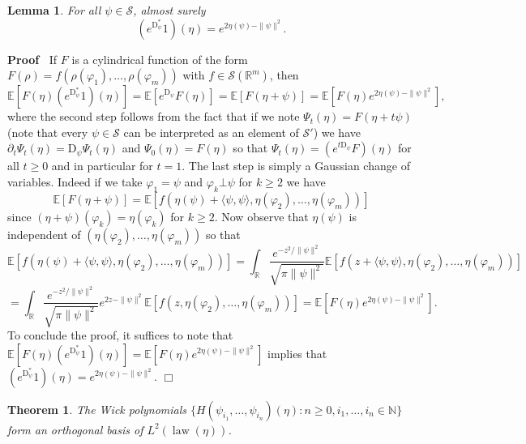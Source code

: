 \documentclass[a4paper,11pt]{article}
\newcommand{\mathD}{\mathrm{D}}
\newcommand{\tmop}[1]{\ensuremath{\operatorname{#1}}}
\newenvironment{proof}{\noindent\textbf{Proof\ }}{\hspace*{\fill}$\Box$\medskip}
\newtheorem{lemma}{Lemma}
{\theorembodyfont{\rmfamily}\newtheorem{remark}{Remark}}
\newtheorem{theorem}{Theorem}
\newcommand{\CS}{\mathscr{S}}
\begin{document}
\begin{lemma}
  \label{lem:exp-D-star}For all $\psi \in \CS$, almost surely
  \[ (e^{\mathD^{\ast}_{\psi}} 1) (\eta) = e^{2 \eta (\psi) - \| \psi \|^2} .
  \]
\end{lemma}

\begin{proof}
  If $F$ is a cylindrical function of the form $F (\rho) = f (\rho
  (\varphi_1), \ldots, \rho (\varphi_m))$ with $f \in \CS (\mathbb{R}^m)$,
  then
  \[ \mathbb{E} [F (\eta) (e^{\mathD^{\ast}_{\psi}} 1) (\eta)] =\mathbb{E}
     [e^{\mathD_{\psi}} F (\eta)] =\mathbb{E} [F (\eta + \psi)] =\mathbb{E}
     [F (\eta) e^{2 \eta (\psi) - \| \psi \|^2}], \]
  where the second step follows from the fact that if we note $\Psi_t (\eta) =
  F (\eta + t \psi)$ (note that every $\psi \in \CS$ can be interpreted as an element of $\CS'$) we have $\partial_t \Psi_t (\eta) = \mathD_{\psi} \Psi_t
  (\eta)$ and $\Psi_0 (\eta) = F (\eta)$ so that $\Psi_t (\eta) = (e^{t
  \mathD_{\psi}} F) (\eta)$ for all $t \geqslant 0$ and in particular for $t =
  1$. The last step is simply a Gaussian change of variables. Indeed if we
  take $\varphi_1 = \psi$ and $\varphi_k \bot \psi$ for $k \geqslant 2$ we
  have
  \[ \mathbb{E} [F (\eta + \psi)] =\mathbb{E} [f (\eta (\psi) + \langle
     \psi, \psi \rangle, \eta (\varphi_2), \ldots, \eta (\varphi_m))] \]
  since $(\eta + \psi) (\varphi_k) = \eta (\varphi_k)$ for $k \geqslant 2$.
  Now observe that $\eta (\psi)$ is independent of $(\eta (\varphi_2), \ldots,
  \eta (\varphi_m))$ so that
  \[ \mathbb{E} [f (\eta (\psi) + \langle \psi, \psi \rangle, \eta
     (\varphi_2), \ldots, \eta (\varphi_m))] = \int_{\mathbb{R}} \frac{e^{-
     z^2 / \| \psi \|^2}}{\sqrt{\pi \| \psi \|^2}} \mathbb{E} [f (z + \langle
     \psi, \psi \rangle, \eta (\varphi_2), \ldots, \eta (\varphi_m))] \]
  \[ = \int_{\mathbb{R}} \frac{e^{- z^2 / \| \psi \|^2}}{\sqrt{\pi \| \psi
     \|^2}} e^{2 z - \| \psi \|^2} \mathbb{E} [f (z, \eta (\varphi_2),
     \ldots, \eta (\varphi_m))] =\mathbb{E} [F (\eta) e^{2 \eta (\psi) - \|
     \psi \|^2}] . \]
  To conclude the proof, it suffices to note that $\mathbb{E} [F (\eta) (e^{\mathD^{\ast}_{\psi}} 1) (\eta)] =\mathbb{E}
     [F (\eta) e^{2 \eta (\psi) - \| \psi \|^2}]$ implies that $(e^{\mathD^{\ast}_{\psi}} 1) (\eta) =e^{2 \eta (\psi) - \| \psi \|^2}$.
\end{proof}

\begin{theorem}
  The Wick polynomials $\{ H (\psi_{i_1}, \ldots, \psi_{i_n}) (\eta) : n
  \geqslant 0, i_1, \ldots, i_n \in \mathbb{N} \}$ form an orthogonal basis
  of $L^2 (\tmop{law} (\eta))$.
\end{theorem}
\end{document}
